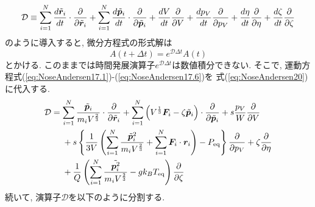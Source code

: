 \begin{equation}
 \mathcal{D}
  \equiv
  \sum_{i=1}^{N} \frac{d \Tilde{\bm{r}}_{i}}{d t} \cdot \frac{\partial}{\partial \Tilde{\bm{r}}_{i}}
  +
  \sum_{i=1}^{N} \frac{d \Tilde{\bm{p}}_{i}}{d t} \cdot \frac{\partial}{\partial \Tilde{\bm{p}}_{i}}
  +
  \frac{d V}{d t} \frac{\partial}{\partial V}
  +
  \frac{d p_{V}}{d t} \frac{\partial}{\partial p_{V}}
  +
  \frac{d \eta}{d t} \frac{\partial}{\partial \eta}
  +
  \frac{d \zeta}{d t} \frac{\partial}{\partial \zeta}
 \label{eq:NoseAndersen20}
\end{equation}
のように導入すると, 微分方程式の形式解は
\begin{equation}
 A(t + \Delta t) = e^{\mathcal{D} \Delta t} A(t)
\end{equation}
とかける. 
このままでは時間発展演算子$e^{\mathcal{D} \Delta t}$は数値積分できない. 
そこで, 運動方程式(\ref{eq:NoseAndersen17.1})-(\ref{eq:NoseAndersen17.6})を
式(\ref{eq:NoseAndersen20})に代入する. 
\begin{align}
 \mathcal{D}
 &=
  \sum_{i=1}^{N} \frac{\Tilde{\bm{p}}_{i}}{ m_{i} V^{\frac{2}{3}}}
  \cdot \frac{\partial}{\partial \Tilde{\bm{r}}_{i}}
  +
  \sum_{i=1}^{N}
  \left(
   V^{\frac{1}{3}} \bm{F}_{i} - \zeta \Tilde{\bm{p}}_{i}
  \right)
  \cdot \frac{\partial}{\partial \Tilde{\bm{p}}_{i}}
  +
  s \frac{p_{V}}{W} \frac{\partial}{\partial V} 
  \notag
  \\ 
  &~~~~
  +
  s \left\{
     \frac{1}{3V} \left(
		   \sum_{i=1}^{N} \frac{\Tilde{\bm{p}}_{i}^{2}}{m_{i} V^{\frac{2}{3}}}
		   + \sum_{i=1}^{N} \bm{F}_{i} \cdot \bm{r}_{i}
		  \right)
     - P_{\mathrm{eq}}
    \right\}
  \frac{\partial}{\partial p_{V}}
  +
  \zeta \frac{\partial}{\partial \eta}
  \notag
  \\ &~~~~
  +
  \frac{1}{Q} \left(
                    \sum_{i=1}^{N} \frac{\Tilde{\bm{p}_{i}^{2}}}{m_{i} V^{\frac{2}{3}}}
                   - g k_{B} T_{\mathrm{eq}}
	       \right)
  \frac{\partial}{\partial \zeta}
 \label{eq:NoseAndersen21}
\end{align}
続いて, 演算子$\mathcal{D}$を以下のように分割する. 
